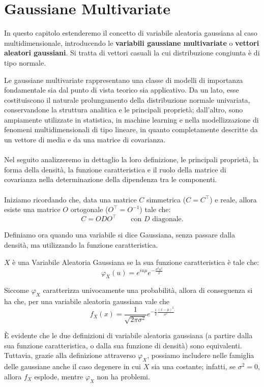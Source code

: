 \chapter{Gaussiane Multivariate}
In questo capitolo estenderemo il concetto di variabile aleatoria gaussiana al caso
multidimensionale, introducendo le \textbf{variabili gaussiane multivariate} o
\textbf{vettori aleatori gaussiani}. Si tratta di vettori casuali la cui distribuzione congiunta è di tipo normale.

\medskip
Le gaussiane multivariate rappresentano una classe di modelli di importanza
fondamentale sia dal punto di vista teorico sia applicativo.  
Da un lato, esse costituiscono il naturale prolungamento della distribuzione
normale univariata, conservandone la struttura analitica e le principali proprietà;
dall’altro, sono ampiamente utilizzate in statistica, in machine learning e nella
modellizzazione di fenomeni multidimensionali di tipo lineare, in quanto completamente
descritte da un vettore di media e da una matrice di covarianza.\\
\\
Nel seguito analizzeremo in dettaglio la loro definizione, le principali
proprietà, la forma della densità, la funzione caratteristica e il ruolo della
matrice di covarianza nella determinazione della dipendenza tra le componenti.\\
\\
Iniziamo ricordando che, data una matrice $C$ simmetrica ($C=C^\top$) e reale, allora esiste una matrice $O$ ortogonale ($O^\top = O^{-1}$) tale che:
\[C = ODO^\top\qquad \text{con $D$ diagonale.}\]

Definiamo ora quando una variabile si dice Gaussiana, senza passare dalla densità, ma utilizzando la funzione caratteristica.

\begin{definizione}
    $X$ è una Variabile Aleatoria Gaussiana se la sua funzione caratteristica è tale che:
    \[\varphi_X(u) = e^{iu\mu}e^{-\frac{\sigma^2 u^2}{2}}\]
\end{definizione}

Siccome $\varphi_X$ caratterizza univocamente una probabilità, allora di conseguenza si ha che, per una variabile aleatoria gaussiana vale che
\[f_X(x) = \frac{1}{\sqrt{2\pi\sigma^2}}e^{-\frac{1}{2}\frac{(x-\mu)^2}{\sigma^2}}\]

È evidente che le due definizioni di variabile aleatoria gaussiana (a partire dalla sua funzione caratteristica, o dalla sua funzione di densità) sono equivalenti. Tuttavia, grazie alla definizione attraverso $\varphi_X$, possiamo includere nelle famiglia delle gaussiane anche il caso degenere in cui $X$ sia una costante; infatti, se $\sigma^2 = 0$, allora $f_X$ esplode, mentre $\varphi_X$ non ha problemi.

